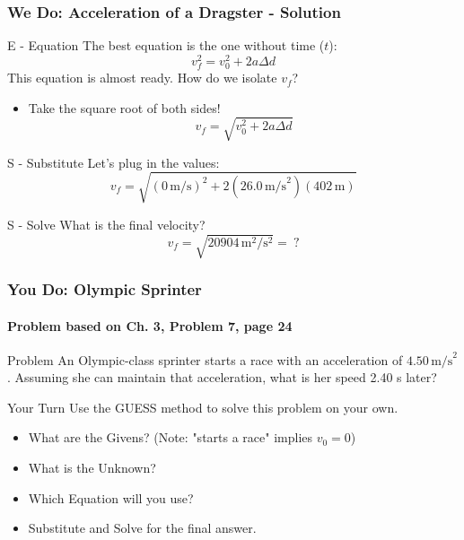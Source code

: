 \documentclass{beamer}
\begin{document}
\begin{frame}
\frametitle{We Do: Acceleration of a Dragster - Solution}
\begin{block}{E - Equation}
The best equation is the one without time ($t$):
\[ v_f^2 = v_0^2 + 2a\Delta d \]
\pause
This equation is almost ready. How do we isolate $v_f$?
\begin{itemize}
    \item \alert{Take the square root of both sides!}
    \[ v_f = \sqrt{v_0^2 + 2a\Delta d} \]
\end{itemize}
\end{block}
\pause
\begin{block}{S - Substitute}
Let's plug in the values:
\[ v_f = \sqrt{(0 \, \text{m/s})^2 + 2(26.0 \, \text{m/s}^2)(402 \, \text{m})} \]
\end{block}
\pause
\begin{block}{S - Solve}
What is the final velocity?
\[ v_f = \sqrt{20904 \, \text{m}^2/\text{s}^2} = \ ? \]
\pause
{}
\end{block}
\end{frame}

\begin{frame}
\frametitle{You Do: Olympic Sprinter}
\framesubtitle{Problem based on Ch. 3, Problem 7, page 24}
\begin{block}{Problem}
An Olympic-class sprinter starts a race with an acceleration of $4.50 \, \text{m/s}^2$. Assuming she can maintain that acceleration, what is her speed 2.40 s later?
\end{block}
\vfill
\begin{alertblock}{Your Turn}
Use the GUESS method to solve this problem on your own.
\begin{itemize}
    \item What are the Givens? (Note: "starts a race" implies $v_0 = 0$)
    \item What is the Unknown?
    \item Which Equation will you use?
    \item Substitute and Solve for the final answer.
\end{itemize}
\end{alertblock}
\end{frame}
\end{document}
